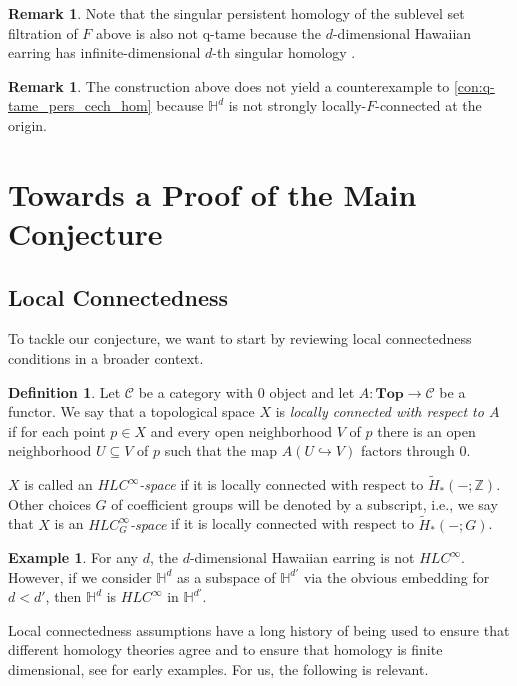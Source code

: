 \documentclass{amsart}
\theoremstyle{plain}
\theoremstyle{definition}
\newtheorem{defi}[thm]{Definition}
\newtheorem{ex}[thm]{Example}
\newtheorem{rem}[thm]{Remark}
\begin{document}
\begin{rem}
Note that the singular persistent homology of the sublevel set filtration of $F$ above is also not q-tame because the $d$-dimensional Hawaiian earring has infinite-dimensional $d$-th singular homology \cite{Barratt.1962}. 
\end{rem}

\begin{rem}
The construction above does not yield a counterexample to \cref{con:q-tame_pers_cech_hom} because $\mathbb{H}^{d}$ is not strongly locally-$F$-connected at the origin.
\end{rem}

\section{Towards a Proof of the Main Conjecture}
\subsection{Local Connectedness}
To tackle our conjecture, we want to start by reviewing local connectedness conditions in a broader context.

\begin{defi}\label{defi:local_connectedness}
Let $\mathcal{C}$ be a category with $0$ object and let $A\colon\mathbf{Top}\to\mathcal{C}$ be a functor. We say that a topological space $X$ is \emph{locally connected with respect to $A$} if for each point $p\in X$ and every open neighborhood $V$ of $p$ there is an open neighborhood $U\subseteq V$ of $p$ such that the map $A(U\hookrightarrow V)$ factors through 0.

$X$ is called an \emph{$HLC^{\infty}$-space} if it is locally connected with respect to $\tilde{H}_*(-;\mathbb{Z})$. Other choices $G$ of coefficient groups will be denoted by a subscript, i.e., we say that $X$ is an \emph{$HLC^{\infty}_G$-space} if it is locally connected with respect to $\tilde{H}_*(-;G)$.
\end{defi}

\begin{ex}
For any $d$, the $d$-dimensional Hawaiian earring is not $HLC^{\infty}$. However, if we consider $\mathbb{H}^{d}$ as a subspace of $\mathbb{H}^{d'}$ via the obvious embedding for $d<d'$, then $\mathbb{H}^{d}$ is $HLC^{\infty}$ in $\mathbb{H}^{d'}$.
\end{ex}

Local connectedness assumptions have a long history of being used to ensure that different homology theories agree and to ensure that homology is finite dimensional, see \cite{MR0007094} for early examples. For us, the following is relevant.
\end{document}
